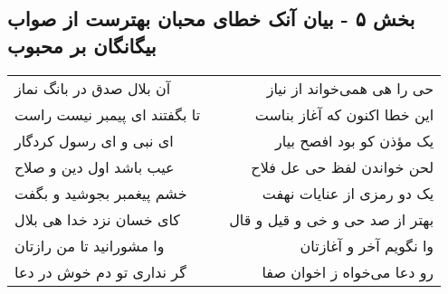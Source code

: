 \begin{center}
\section*{بخش ۵ - بیان آنک خطای محبان بهترست از  صواب بیگانگان بر محبوب}
\label{sec:sh005}
\begin{longtable}{l p{0.5cm} r}
آن بلال صدق در بانگ نماز
&&
حی را هی همی‌خواند از نیاز
\\
تا بگفتند ای پیمبر نیست راست
&&
این خطا اکنون که آغاز بناست
\\
ای نبی و ای رسول کردگار
&&
یک مؤذن کو بود افصح بیار
\\
عیب باشد اول دین و صلاح
&&
لحن خواندن لفظ حی عل فلاح
\\
خشم پیغمبر بجوشید و بگفت
&&
یک دو رمزی از عنایات نهفت
\\
کای خسان نزد خدا هی بلال
&&
بهتر از صد حی و خی و قیل و قال
\\
وا مشورانید تا من رازتان
&&
وا نگویم آخر و آغازتان
\\
گر نداری تو دم خوش در دعا
&&
رو دعا می‌خواه ز اخوان صفا
\\
\end{longtable}
\end{center}
